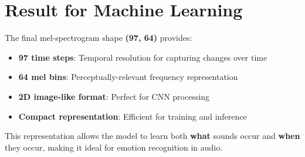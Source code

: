 \documentclass[12pt]{article}
\begin{document}
\section{Result for Machine Learning}

The final mel-spectrogram shape \textbf{(97, 64)} provides:
\begin{itemize}
    \item \textbf{97 time steps}: Temporal resolution for capturing changes over time
    \item \textbf{64 mel bins}: Perceptually-relevant frequency representation
    \item \textbf{2D image-like format}: Perfect for CNN processing
    \item \textbf{Compact representation}: Efficient for training and inference
\end{itemize}

This representation allows the model to learn both \textbf{what} sounds occur and \textbf{when} they occur, making it ideal for emotion recognition in audio.
\end{document}

